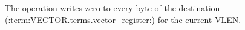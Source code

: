 The operation writes zero to every byte of the destination (:term:VECTOR.terms.vector_register:) for
the current VLEN.
